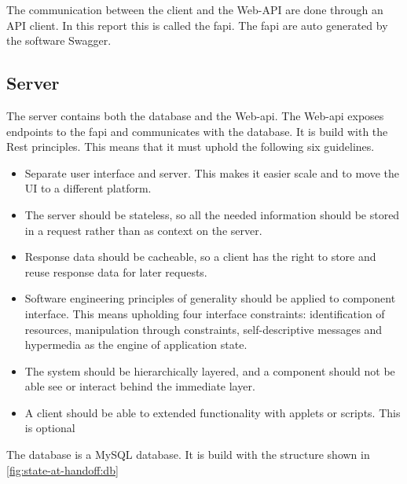 The communication between the client and the Web-API are done through an API client. In this report this is called the \gls{fapi}. The \gls{fapi} are auto generated by the software Swagger.

\subsection{Server}
The server contains both the database and the Web-api. The Web-api exposes endpoints to the \gls{fapi} and communicates with the database. It is build with the Rest principles. This means that it must uphold the following six guidelines\cite{REST}. 
\begin{itemize}
    \item Separate user interface and server. This makes it easier scale and to move the UI to a different platform.
    \item The server should be stateless, so all the needed information should be stored in a request rather than as context on the server.
    \item Response data should be cacheable, so a client has the right to store and reuse response data for later requests. 
    \item Software engineering principles of generality should be applied to component interface. This means upholding four interface constraints: identification of resources, manipulation through constraints, self-descriptive messages and hypermedia as the engine of application state. 
    \item The system should be hierarchically layered, and a component should not be able see or interact behind the immediate layer.
    \item A client should be able to extended functionality with applets or scripts. This is optional
\end{itemize}

The database is a MySQL database. It is build with the structure shown in \ref{fig:state-at-handoff:db}

